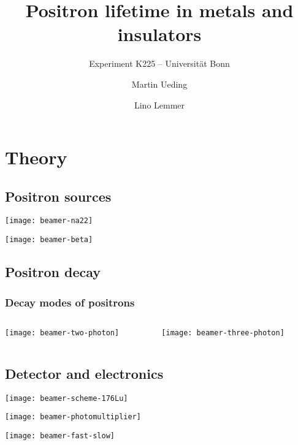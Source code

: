 \documentclass[english, fleqn]{beamer}
\title{Positron lifetime in metals and insulators}
\subtitle{Experiment K225 -- Universität Bonn}
\author{%
    Martin Ueding
    \and
    Lino Lemmer
}
\date{\daterange{2016-03-24}{2016-03-25}}
\begin{document}
\begin{frame}
    \titlepage
\end{frame}

\section{Theory}

\subsection{Positron sources}

\begin{frame}
\texttt{[image: beamer-na22]}
\end{frame}

\begin{frame}
\texttt{[image: beamer-beta]}
\end{frame}

\subsection{Positron decay}

\begin{frame}
    \frametitle{Decay modes of positrons}

    \begin{columns}[c]
        \begin{column}{.5\textwidth}
            \centering
            \texttt{[image: beamer-two-photon]}
        \end{column}
        \begin{column}{.5\textwidth}
            \centering
            \texttt{[image: beamer-three-photon]}
        \end{column}
    \end{columns}
\end{frame}

\subsection{Detector and electronics}

\begin{frame}
    \texttt{[image: beamer-scheme-176Lu]}
\end{frame}


\begin{frame}
    \texttt{[image: beamer-photomultiplier]}
\end{frame}


\begin{frame}
    \texttt{[image: beamer-fast-slow]}
\end{frame}
\end{document}
